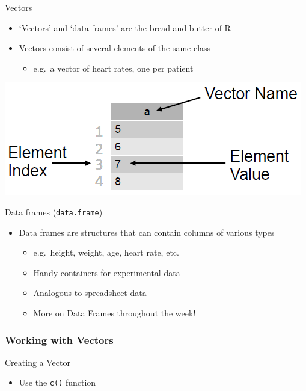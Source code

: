 \documentclass[
]{book}
\providecommand{\tightlist}{%
  \setlength{\itemsep}{0pt}\setlength{\parskip}{0pt}}
\begin{document}
Vectors

\begin{itemize}
\tightlist
\item
  `Vectors' and `data frames' are the bread and butter of R
\item
  Vectors consist of several elements of the same class

  \begin{itemize}
  \tightlist
  \item
    e.g.~a vector of heart rates, one per patient
  \end{itemize}
\end{itemize}

\includegraphics{images/simple_vector.png}

Data frames (\texttt{data.frame})

\begin{itemize}
\tightlist
\item
  Data frames are structures that can contain columns of various types

  \begin{itemize}
  \tightlist
  \item
    e.g.~height, weight, age, heart rate, etc.
  \item
    Handy containers for experimental data
  \item
    Analogous to spreadsheet data
  \item
    More on Data Frames throughout the week!
  \end{itemize}
\end{itemize}

\hypertarget{working-with-vectors}{%
\subsubsection*{Working with Vectors}\label{working-with-vectors}}

Creating a Vector

\begin{itemize}
\tightlist
\item
  Use the \texttt{c()} function
\end{itemize}
\end{document}
